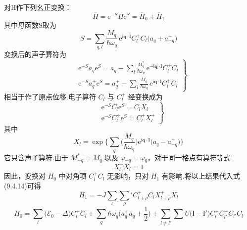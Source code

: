 对H作下列幺正变换：
\begin{equation}
  \overline{H}=\mathrm{e}^{-S}H\mathrm{e}^{S}
  =\overline{H}_{0}+\overline{H}_{1}
\end{equation}
其中母函数S取为
\begin{equation}
  S=\sum_{q,l}\frac{M_{q}}{\hbar\omega_{q}}\,
  \mathrm{e}^{\mathrm{i}\boldsymbol{q}\cdot\boldsymbol{l}}C_{l}^{+}C_{l}
  \bigl(a_{q}+a_{-q}^{+}\bigr)
\end{equation}
变换后的声子算符为
\begin{equation}
\left.
\begin{aligned}
  &\mathrm{e}^{-S}a_{q}\mathrm{e}^{S}=a_{q}
  -\sum_{l}\frac{M_{q}^{*}}{\hbar\omega_{q}}\,
  \mathrm{e}^{-\mathrm{i}\boldsymbol{q}\cdot\boldsymbol{l}}C_{l}^{+}C_{l}\\
  &\mathrm{e}^{-S}a_{q}^{+}\mathrm{e}^{S}=a_{q}^{+}
  -\sum_{l}\frac{M_{q}}{\hbar\omega_{q}}\,
  \mathrm{e}^{\mathrm{i}\boldsymbol{q}\cdot\boldsymbol{l}}C_{l}^{+}C_{l}
\end{aligned}\right\}
\end{equation}
相当于作了原点位移.电子算符 $C_{l}$ 与 $C_{l}^{+}$ 经变换成为
\begin{equation}
\left.
\begin{aligned}
  &\mathrm{e}^{-S}C_{l}\mathrm{e}^{S}=C_{l}X_{l}\\
  &\mathrm{e}^{-S}C_{l}^{+}\mathrm{e}^{S}=C_{l}^{+}X_{l}^{+}
\end{aligned}\right\}
\end{equation}
其中
\begin{equation}
  X_{l}=\exp\biggl\{\sum_{q}\biggl(\frac{M_{q}}{\hbar\omega_{q}}\biggr)
  \mathrm{e}^{\mathrm{i}\boldsymbol{q}\cdot\boldsymbol{l}}
  \bigl(a_{q}-a_{-q}^{+}\bigr)\biggr\}
\end{equation}
它只含声子算符.由于 $M_{-q}^{*}=M_{q}$ 以及 $\omega_{-q}=\omega_{q}$，对于同一格点有算符等式
\begin{equation}
  X_{l}^{+}X_{l}=1
\end{equation}
因此，变换对 $H_{0}$ 中对角项 $C_{l}^{+}C_{l}$ 无影响，只对 $H_{1}$ 有影响.将以上结果代入式(9.4.14)可得
\begin{equation}
  \overline{H}_{1}=-J\sum_{l}\sum_{\rho}'
  C_{l+\rho}^{+}C_{l}X_{l+\rho}^{+}X_{l}
\end{equation}
\begin{equation}
  \overline{H}_{0}=\sum_{l}\bigl(\mathscr{E}_{0}-\Delta\bigr)C_{l}^{+}C_{l}
  +\sum_{q}\hbar\omega_{q}\biggl(a_{q}^{+}a_{q}+\frac{1}{2}\biggr)
  +\sum_{l\neq l'}\sum U\bigl(\boldsymbol{l}-\boldsymbol{l}'\bigr)
  C_{l}^{+}C_{l'}^{+}C_{l'}C_{l}
\end{equation}
